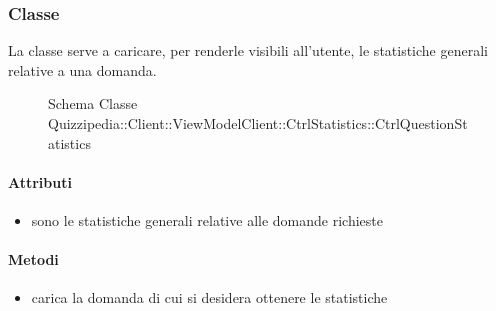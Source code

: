 \subsubsection{Classe }
La classe serve a caricare, per renderle visibili all'utente, le statistiche generali relative a una domanda.
\begin{figure}[H]
\centering
\noindent{}
\caption[Schema Classe CtrlQuestionStatistics]{Schema Classe Quizzipedia::Client::ViewModelClient::CtrlStatistics::CtrlQuestionStatistics}
\end{figure}
\paragraph{Attributi}
\begin{itemize}
\item {}
\newline
sono le statistiche generali relative alle domande richieste
\end{itemize}
\paragraph{Metodi}
\begin{itemize}
\item {}
\newline
carica la domanda di cui si desidera ottenere le statistiche
\newline
\end{itemize}
